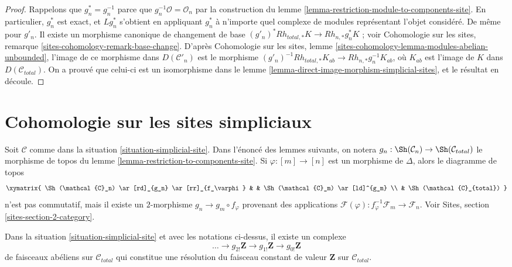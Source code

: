 \begin{proof}
Rappelons que $g_n^* = g_n^{-1}$ parce que $g_n^{-1}\mathcal{O} = \mathcal{O}_n$
par la construction du lemme \ref{lemma-restriction-module-to-components-site}.
En particulier, $g_n^*$ est exact, et $Lg_n^*$ s'obtient en appliquant $g_n^*$
à n'importe quel complexe de modules représentant l'objet considéré. De même pour $g'_n$.
Il existe un morphisme canonique de changement de base
$(g'_n)^*Rh_{total, *}K \to Rh_{n, *}g_n^*K$ ; voir
Cohomologie sur les sites, remarque \ref{sites-cohomology-remark-base-change}.
D'après Cohomologie sur les sites, lemme
\ref{sites-cohomology-lemma-modules-abelian-unbounded},
l'image de ce morphisme dans $D(\mathcal{C}'_n)$ est le morphisme
$(g'_n)^{-1}Rh_{total, *}K_{ab} \to Rh_{n, *}g_n^{-1}K_{ab}$,
où $K_{ab}$ est l'image de $K$ dans $D(\mathcal{C}_{total})$.
On a prouvé que celui-ci est un isomorphisme dans le
lemme \ref{lemma-direct-image-morphism-simplicial-sites},
et le résultat en découle.
\end{proof}








\section{Cohomologie sur les sites simpliciaux}
\label{section-cohomology-simplicial-sites}

\noindent
Soit $\mathcal{C}$ comme dans la situation \ref{situation-simplicial-site}.
Dans l'énoncé des lemmes suivants, on notera
$g_n : \Sh(\mathcal{C}_n) \to \Sh(\mathcal{C}_{total})$ le
morphisme de topos du
lemme \ref{lemma-restriction-to-components-site}. Si $\varphi : [m] \to [n]$
est un morphisme de $\Delta$, alors le diagramme de topos
$$
\xymatrix{
\Sh(\mathcal{C}_n) \ar[rd]_{g_n} \ar[rr]_{f_\varphi} & &
\Sh(\mathcal{C}_m) \ar[ld]^{g_m} \\
& \Sh(\mathcal{C}_{total})
}
$$
n'est pas commutatif, mais il existe un $2$-morphisme $g_n \to g_m \circ f_\varphi$
provenant des applications
$\mathcal{F}(\varphi) : f_\varphi^{-1}\mathcal{F}_m \to \mathcal{F}_n$.
Voir Sites, section \ref{sites-section-2-category}.

\begin{lemma}
\label{lemma-simplicial-resolution-Z-site}
Dans la situation \ref{situation-simplicial-site} et avec les notations ci-dessus,
il existe un complexe
$$
\ldots \to g_{2!}\mathbf{Z} \to g_{1!}\mathbf{Z} \to g_{0!}\mathbf{Z}
$$
de faisceaux abéliens sur $\mathcal{C}_{total}$ qui constitue une résolution du
faisceau constant de valeur $\mathbf{Z}$ sur $\mathcal{C}_{total}$.
\end{lemma}


